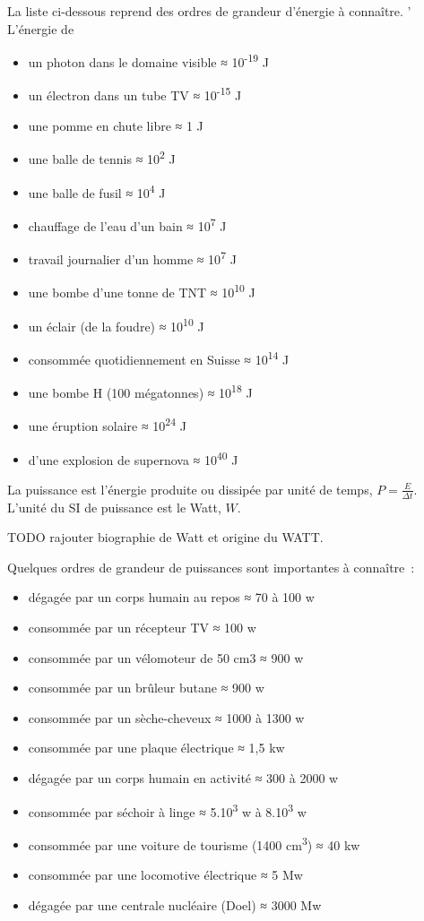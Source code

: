 \begin{multicols}{2}
La liste ci-dessous reprend des ordres de grandeur d'énergie à connaître.
'
L'énergie de
\begin{itemize}
  \item un photon dans le domaine visible ≈ 10\textsuperscript{-19}
J
  \item un électron dans un tube TV ≈ 10\textsuperscript{-15 }J
  \item une pomme en chute libre ≈ 1 J
  \item une balle de tennis ≈ 10\textsuperscript{2} J
  \item une balle de fusil ≈ 10\textsuperscript{4} J
  \item chauffage de l'eau d'un bain ≈ 10\textsuperscript{7} J
  \item travail journalier d'un homme ≈ 10\textsuperscript{7} J
  \item une bombe d'une tonne de TNT ≈ 10\textsuperscript{10} J
  \item un éclair (de la foudre) ≈ 10\textsuperscript{10 }J
  \item consommée quotidiennement en Suisse ≈ 10\textsuperscript{14} J
  \item une bombe H (100 mégatonnes) ≈ 10\textsuperscript{18 }J
  \item une éruption solaire ≈ 10\textsuperscript{24} J
  \item d'une explosion de supernova ≈ 10\textsuperscript{40} J
\end{itemize}

La puissance est l'énergie produite ou dissipée par unité de temps, $P = \frac{E}{\Delta t}$. 
L'unité du SI de puissance est le Watt, $W$. 

TODO rajouter biographie de Watt et origine du WATT.

Quelques ordres de grandeur de puissances sont importantes à connaître~:
\begin{itemize}
  \item  dégagée par un corps humain au repos ≈ 70 à 100 w
  \item  consommée par un récepteur TV ≈ 100 w
  \item  consommée par un vélomoteur de 50 cm3 ≈ 900 w
  \item  consommée par un brûleur butane ≈ 900 w
  \item  consommée par un sèche-cheveux ≈ 1000 à 1300 w
  \item  consommée par une plaque électrique ≈ 1,5 kw
  \item  dégagée par un corps humain en activité ≈ 300 à 2000 w
  \item  consommée par séchoir à linge ≈ 5.10\textsuperscript{3} w à
8.10\textsuperscript{3} w
  \item  consommée par une voiture de tourisme (1400
cm\textsuperscript{3}) ≈ 40 kw
  \item  consommée par une locomotive électrique ≈ 5 Mw
  \item  dégagée par une centrale nucléaire (Doel) ≈ 3000 Mw
\end{itemize}




\end{multicols}
